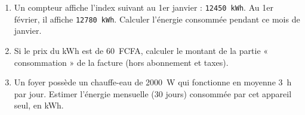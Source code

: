\documentclass[11pt]{article}
\begin{document}
\begin{exercice}
\begin{enumerate}
    \item Un compteur affiche l'index suivant au 1er janvier : \texttt{12450 kWh}. Au 1er février, il affiche \texttt{12780 kWh}. Calculer l'énergie consommée pendant ce mois de janvier.
    \item Si le prix du kWh est de \SI{60}{FCFA}, calculer le montant de la partie « consommation » de la facture (hors abonnement et taxes).
    \item Un foyer possède un chauffe-eau de \SI{2000}{W} qui fonctionne en moyenne \SI{3}{h} par jour. Estimer l'énergie mensuelle (30 jours) consommée par cet appareil seul, en kWh.
\end{enumerate}
\end{exercice}
\end{document}
